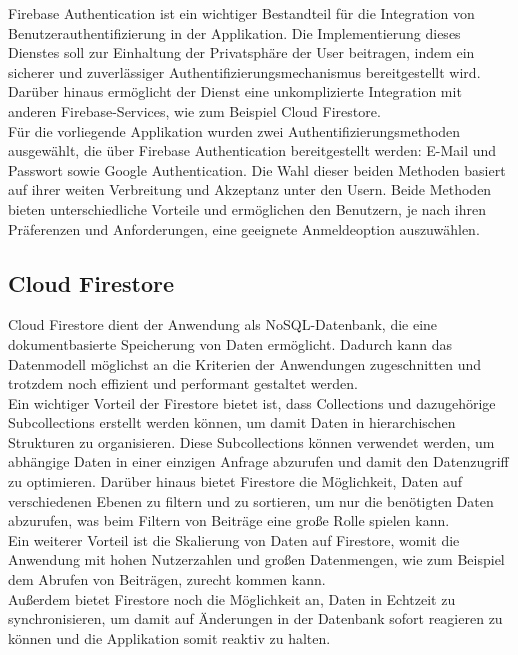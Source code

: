 Firebase Authentication ist ein wichtiger Bestandteil für die Integration von Benutzerauthentifizierung in der Applikation. Die Implementierung dieses Dienstes soll zur Einhaltung der Privatsphäre der User beitragen, indem ein sicherer und zuverlässiger Authentifizierungsmechanismus bereitgestellt wird.
\\
Darüber hinaus ermöglicht der Dienst eine unkomplizierte Integration mit anderen Firebase-Services, wie zum Beispiel Cloud Firestore.
\\
Für die vorliegende Applikation wurden zwei Authentifizierungsmethoden ausgewählt, die über Firebase Authentication bereitgestellt werden: E-Mail und Passwort sowie Google Authentication. Die Wahl dieser beiden Methoden basiert auf ihrer weiten Verbreitung und Akzeptanz unter den Usern. Beide Methoden bieten unterschiedliche Vorteile und ermöglichen den Benutzern, je nach ihren Präferenzen und Anforderungen, eine geeignete Anmeldeoption auszuwählen.


\subsection{Cloud Firestore}
Cloud Firestore dient der Anwendung als NoSQL-Datenbank, die eine dokumentbasierte Speicherung von Daten ermöglicht. Dadurch kann das Datenmodell möglichst an die Kriterien der Anwendungen zugeschnitten und trotzdem noch effizient und performant gestaltet werden.
\\
Ein wichtiger Vorteil der Firestore bietet ist, dass Collections und dazugehörige Subcollections erstellt werden können, um damit Daten in hierarchischen Strukturen zu organisieren. Diese Subcollections können verwendet werden, um abhängige Daten in einer einzigen Anfrage abzurufen und damit den Datenzugriff zu optimieren. Darüber hinaus bietet Firestore die Möglichkeit, Daten auf verschiedenen Ebenen zu filtern und zu sortieren, um nur die benötigten Daten abzurufen, was beim Filtern von Beiträge eine große Rolle spielen kann.
\\
Ein weiterer Vorteil ist die Skalierung von Daten auf Firestore, womit die Anwendung mit hohen Nutzerzahlen und großen Datenmengen, wie zum Beispiel dem Abrufen von Beiträgen, zurecht kommen kann.
\\
Außerdem bietet Firestore noch die Möglichkeit an, Daten in Echtzeit zu synchronisieren, um damit auf Änderungen in der Datenbank sofort reagieren zu können und die Applikation somit reaktiv zu halten.


